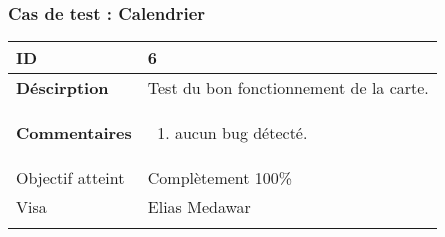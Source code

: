 		 		 \subsubsection*{Cas de test : Calendrier}
		 		 		 		 		 \begin{longtable}{m{4cm}|p{10cm}|}
		 		 		 		 		 \textbf{ ID} & 6 \\
		 		 		 		 		 \hline \textbf{Déscirption} &  Test du bon fonctionnement de la carte.\\
		 		 		 		 		 \hline \textbf{Commentaires} &  
		 		 		 		 		 	 	 \begin{enumerate}
					 		 	 		 		 		 	 		\item aucun bug détecté.
					 		 	 		 					 	\end{enumerate} \\
		 		 	 		 		 		 \hline Objectif atteint & {\color{green} Complètement 100\% \CheckedBox } \\
					 		 	 		 		 		\hline Visa & Elias Medawar 	\\
					 		 		 		 		\\
		 		 		 		 \end{longtable} 


